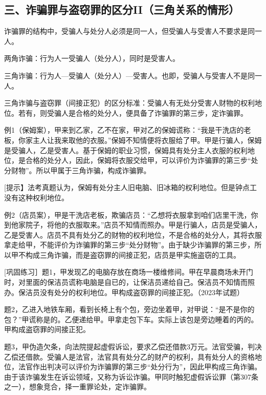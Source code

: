\subsection*{三、诈骗罪与盗窃罪的区分II（三角关系的情形）}


诈骗罪的结构中，受骗人与处分人必须是同一人，但受骗人与受害人不要求是同一人。

两角诈骗：行为人一受骗人（处分人），同时是受害人。

三角诈骗：行为人—受骗人（处分人）—受害人。也即，受骗人与受害人不是同一人。

三角诈骗与盗窃罪（间接正犯）的区分标准：受骗人有无处分受害人财物的权利地位。若有，则受骗人是合格的处分人，便具备了诈骗罪的第三步，定诈骗罪。


例1（保姆案），甲来到乙家，乙不在家，甲对乙的保姆谎称：“我是干洗店的老板，你家主人让我来取他的衣服。”保姆不知情便将衣服给了甲。甲是行骗人，保姆是受骗人，乙是受害人。基于保姆的职业习惯，保姆具有处分主人衣服的权利地位，是合格的处分人，因此，保姆将衣服交给甲，可以评价为诈骗罪的第三步“处分财物”。所以甲属于三角诈骗，构成诈骗罪。

[提示】法考真题认为，保姆有处分主人旧电脑、旧冰箱的权利地位。但是钟点工没有这种权利地位。

例2（店员案），甲是干洗店老板，欺骗店员：“乙想将衣服拿到咱们店里干洗，你到他家院子，将他的衣服取来。”店员不知情而照办。甲是行骗人，店员是受骗人，乙是受害人。店员不具有处分乙的财物的权利地位，不是合格的处分人，其将衣服拿走给甲，不能评价为诈骗罪的第三步“处分财物”。由于缺少诈骗罪的第三步，所以甲不构成三角诈骗，而是盗窃罪的间接正犯，店员是甲实施盗窃的工具。

[巩固练习］题1，甲发现乙的电脑存放在商场一楼维修间。甲在早晨商场未开门时，对里面的保洁员谎称电脑是自已的，让保洁员递给自己。保洁员不知情而照办。保洁员没有处分的权利地位。甲构成盗窃罪的间接正犯。（2023年试题）

题2，乙进入地铁车厢，看到长椅上有个包，旁边坐着甲，对甲说：“是不是你的包？”甲谎称是的。乙便递给甲。甲拿走包下车。实际上该包是旁边睡着的丙的。甲构成盗窃罪的间接正犯。

题3，甲伪造欠条，向法院提起虚假诉讼，要求乙偿还借款3万元。法官受骗，判决乙偿还借款。受骗人是法官，法官具有处分乙的财产的权利，具有处分人的资格地位，法官作出判决可以评价为诈骗罪的第三步“处分行为”，因此甲构成三角诈骗。由于该诈骗发生在诉讼领域，又称为诉讼诈骗。甲同时触犯虚假诉讼罪（第307条之一），想象竞合，择一重罪论处，定诈骗罪。

